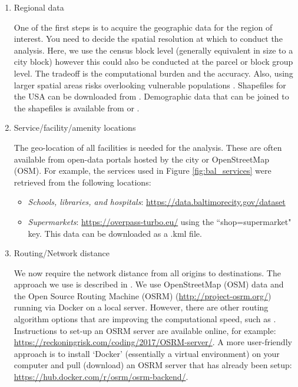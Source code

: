 \documentclass[onecolumn,doublespacing]{risa}
\let \citeA \textcite
\let \cite \parencite
\begin{document}
\begin{enumerate}[listparindent=0em, parsep=0.5em,itemindent=0em]
    \item Regional data

    One of the first steps is to acquire the geographic data for the region of interest. 
    You need to decide the spatial resolution at which to conduct the analysis. 
    Here, we use the census block level (generally equivalent in size to a city block) however this could also be conducted at the parcel or block group level. 
    The tradeoff is the computational burden and the accuracy.
    Also, using larger spatial areas risks overlooking vulnerable populations \cite{Logan2017-fr}.
    Shapefiles for the USA can be downloaded from \cite{Manson2018-ug}.
    Demographic data that can be joined to the shapefiles is available from \citeA{Manson2018-ug} or \citeA{US_Census_Bureau2017-ti}.
    
    \item Service/facility/amenity locations
    
    The geo-location of all facilities is needed for the analysis.
    These are often available from open-data portals hosted by the city or OpenStreetMap (OSM).
    For example, the services used in Figure \ref{fig:bal_services} were retrieved from the following locations:
    \begin{itemize}
        \item \textit{Schools, libraries, and hospitals}: \url{https://data.baltimorecity.gov/dataset}
        \item \textit{Supermarkets}: \url{https://overpass-turbo.eu/} using the ``shop=supermarket" key. This data can be downloaded as a .kml file.
    \end{itemize}
    
    \item Routing/Network distance
    
    We now require the network distance from all origins to destinations.
    The approach we use is described in \cite{Logan2017-fr}.
    We use OpenStreetMap (OSM) data and the Open Source Routing Machine (OSRM) \cite{luxen-vetter-2011} (\url{http://project-osrm.org/}) running via Docker \cite{Merkel2014-op} on a local server.
    However, there are other routing algorithm options that are improving the computational speed, such as \citeA{noel2019-pypi}.
    Instructions to set-up an OSRM server are available online, for example: \url{https://reckoningrisk.com/coding/2017/OSRM-server/}.
    A more user-friendly approach is to install `Docker' (essentially a virtual environment) on your computer and pull (download) an OSRM server that has already been setup: \url{https://hub.docker.com/r/osrm/osrm-backend/}.
    

\end{enumerate}
\end{document}

